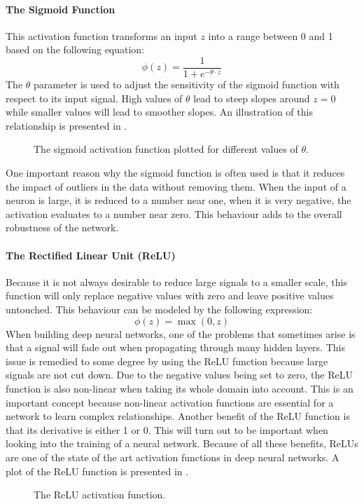 \paragraph{The Sigmoid Function}
This activation function transforms an input \(z\) into a range between 0
and 1 based on the following equation:
\begin{equation}
  \phi(z) = \frac{1}{1 + e^{-\theta \cdot z}}
\end{equation}
The \(\theta\) parameter is used to adjust the sensitivity of the
sigmoid function with respect to its input signal. High values of \(\theta\) lead
to steep slopes around \(z=0\) while smaller values will lead to smoother
slopes. An illustration of this relationship is presented in .
\begin{figure}[h]
  \centering
  
  \caption{The sigmoid activation function plotted for different
    values of \(\theta\).}
  \label{fig:sigmoid}
\end{figure}

One important reason why the sigmoid function is often used is that it reduces
the impact of outliers in the data without removing them. When the
input of a neuron is large, it is reduced to a number near one, when it
is very negative, the activation evaluates to a number near zero. This
behaviour adds to the overall robustness of the network.

\paragraph{The Rectified Linear Unit (ReLU)}
Because it is not always desirable to reduce large signals to a
smaller scale, this function will only replace negative values with
zero and leave positive values untouched. This behaviour can be
modeled by the following expression:
\begin{equation}
  \phi(z) = \max(0, z)
\end{equation}
When building deep neural networks, one of the problems that sometimes
arise is that a signal will fade out when propagating through many
hidden layers. This issue is remedied to some degree by using the ReLU
function because large signals are not cut down. Due to the negative
values being set to zero, the ReLU function is also non-linear when
taking its whole domain into account. This is an important concept
because non-linear activation functions are essential for a network to
learn complex relationships. Another benefit of the ReLU function is
that its derivative is either 1 or 0. This will turn out to be important when
looking into the training of a neural network. Because of all these benefits,
ReLUs are one of the state of the art activation functions in deep
neural networks. A plot of the ReLU function is presented in .
\begin{figure}[h]
  \centering
  
  \caption{The ReLU activation function.}
  \label{fig:relu}
\end{figure}

